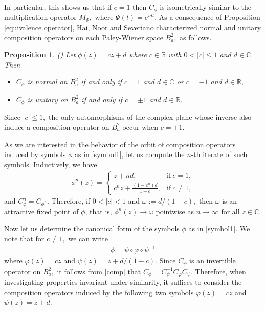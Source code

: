 \documentclass[11pt]{amsart}%
\numberwithin{equation}{section}
\theoremstyle{plain}
\newtheorem{pps}{Proposition}
\theoremstyle{definition}
\theoremstyle{definition}
\begin{document}
In particular, this shows us that if $c=1$ then $C_{\phi}$ is isometrically similar to the multiplication operator $M_{\Psi},$ where $\Psi(t)=e^{idt}.$  As a consequence of Proposition \ref{equivalence operator}, Hai, Noor and Severiano characterized normal and unitary composition operators on each Paley-Wiener space $B^2_a,$ as follows.


\begin{pps}\label{normal-unitary} \normalfont (\cite[Proposition 3]{Hai}) Let $\phi(z)=cz+d$ where $c\in \mathbb{R}$ with $0<|c|\leq1$ and $d\in \mathbb{C}.$ Then 
\begin{itemize}
\item $C_{\phi}$ is normal on $B^2_a$ if and only if $c=1$ and $d\in \mathbb{C}$ or $c=-1$ and $d\in \mathbb{R},$
\item  $C_{\phi}$ is unitary on $B^2_a$ if and only if $c=\pm 1$ and $d\in \mathbb{R}.$
\end{itemize}
\end{pps}

Since $|c|\leq 1,$ the only automorphisms of the complex plane whose inverse also induce a composition operator on $B^2_a$ occur when $c=\pm 1.$


As we are interested in the behavior of the orbit of composition operators induced by symbols $\phi$ as in \eqref{symbol1}, let us compute the $n$-th iterate of such symbols. Inductively, we have 
\begin{align*}
\phi^{n}(z)= \begin{cases}z+n d, & \text{if} \ c=1, \\ 
c^{n} z+\frac{(1-c^n)d}{1-c},  & \text{if} \ c \neq 1 ,
\end{cases}
\end{align*}	
and $C_{\phi}^n=C_{\phi^{n}}.$ Therefore, if $0<|c|<1$ and $\omega:=d/(1-c),$ then $\omega$ is an attractive fixed point of $\phi$, that is,  $\phi^{n}(z)\rightarrow \omega$ pointwise as $n\rightarrow \infty$ for all $z\in \mathbb{C}.$ 


Now let us determine the canonical form of the symbols $\phi$ as in \eqref{symbol1}. We note that for $c\neq 1,$  we can write
 \begin{align}\label{comp}
\phi=\psi\circ \varphi\circ \psi^{-1}
\end{align}
 where $\varphi(z)=cz$ and $\psi(z)=z+d/(1-c).$ Since $C_{\psi}$ is an invertible operator on $B^2_a,$ it follows from \eqref{comp} that $C_{\phi}=C_{\psi}^{-1}C_{\varphi}C_{\psi}.$ Therefore, when investigating properties invariant under similarity, it suffices to consider the composition operators induced by the following two symbols $\varphi(z)=cz$ and $\psi(z)=z+d.$    
\end{document}
